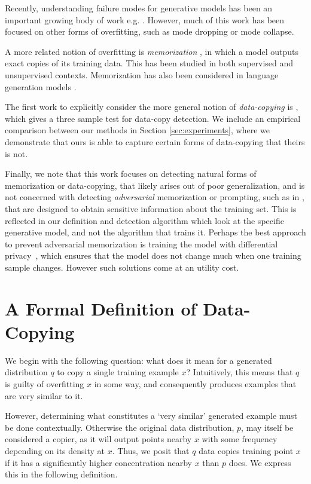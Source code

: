 Recently, understanding failure modes for generative models has been an important growing body of work e.g. \citep{SGZCRC16, RW18, SBLBG18}. However, much of this work has been focused on other forms of overfitting, such as mode dropping or mode collapse.

A more related notion of overfitting is \textit{memorization} \citep{lopez2016revisiting,XHYGSWK18, C18}, in which a model outputs exact copies of its training data. This has been studied in both supervised \citep{BBFST21, Feldman20} and unsupervised \citep{BGWC21, CHCW21} contexts. Memorization has also been considered in language generation models \cite{Carlini22}. 

The first work to explicitly consider the more general notion of \textit{data-copying} is \citep{MCD2020}, which gives a three sample test for data-copy detection. We include an empirical comparison between our methods in Section \ref{sec:experiments}, where we demonstrate that ours is able to capture certain forms of data-copying that theirs is not. 

Finally, we note that this work focuses on detecting natural forms of memorization or data-copying, that likely arises out of poor generalization, and is not concerned with detecting \textit{adversarial} memorization or prompting, such as in \cite{Carlini19}, that are designed to obtain sensitive information about the training set. This is reflected in our definition and detection algorithm which look at the specific generative model, and not the algorithm that trains it.  Perhaps the best approach to prevent adversarial  memorization is training the model with differential privacy~\cite{Dwork06}, which ensures that the model does not change much when one training sample changes. However such solutions come at an utility cost. 

\section{A Formal Definition of Data-Copying}

We begin with the following question: what does it mean for a generated distribution $q$ to copy a single training example $x$? Intuitively, this means that $q$ is guilty of overfitting $x$ in some way, and consequently produces examples that are very similar to it. 

However, determining what constitutes a `very similar'  generated example must be done contextually. Otherwise the original data distribution, $p$, may itself be considered a copier, as it will output points nearby $x$ with some frequency depending on its density at $x$. Thus, we posit that $q$ data copies training point $x$ if it has a significantly higher concentration nearby $x$ than $p$ does. We express this in the following definition. 

